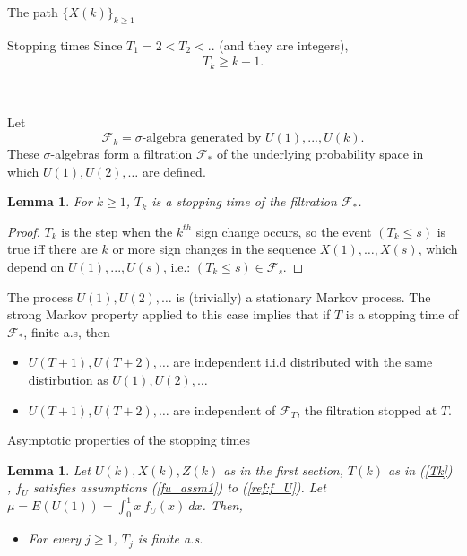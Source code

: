\documentclass[12pt]{article}
\newtheorem{lemma}[theorem]{Lemma}
\newenvironment{remark}[1][Remark]{\begin{trivlist}
		\item[\hskip \labelsep {\bfseries #1}]}{\end{trivlist}}
\begin{document}
\begin{section}{The path $\{X(k)\}_{k\ge1}$ }
\begin{subsection}{Stopping times}
Since $T_1 =2 < T_2 <..$ (and they are integers), 
\begin{align}
T_k \ge k+1 .
\end{align}

\   
\   
\   
\   

Let 
\begin{equation} \label{eq:filter}
\mathcal{F}_k = \sigma \text{-algebra generated by $U(1),...,U(k)$}.
\end{equation}
These $\sigma$-algebras form a filtration $\mathcal{F}_{\!*}$ of the underlying probability space in which $U(1), U(2), \dots$ are defined.

\begin{lemma}
For $k \ge 1$,  $T_k$ is a stopping time of the  filtration $\mathcal{F}_{\!*}$.
\end{lemma}

\begin{proof}
	$T_k$ is the step when the $k^{th}$ sign change occurs, so the event $(T_k \le s)$ is true iff there are $k$ or more sign changes in the sequence $X(1),\dots,X(s)$, which depend on  $U(1),...,U(s)$, i.e.: $(T_k \le s) \in \mathcal{F}_s$.
\end{proof}

	\begin{remark}[Remarks]
	The process $U(1), U(2), \dots$ is (trivially) a stationary Markov process. The strong Markov property applied to this case implies that if $T$ is a stopping time of $\mathcal{F}_{\!*}$, finite a.s, then
	
		\begin{itemize}
			\item[i.] $U(T+1), U(T+2) ,\dots$ are independent i.i.d distributed with the same distirbution as $U(1), U(2) ,\dots$
			\item[ii.] $U(T+1), U(T+2) ,\dots$ are independent of $\mathcal{F}_T$, the filtration stopped at $T$.
		\end{itemize}
	 
	\end{remark}
\end{subsection}


\begin{subsection}{Asymptotic properties of the stopping times}

\begin{lemma} \label{lmm:Ts} Let $U(k),X(k),Z(k)$ as in the first section, $T(k)$ as in (\ref{Tk}) , $f_U$ satisfies assumptions (\ref{fu_assm1}) to (\ref{ref:f_U}). Let $\mu = E(U(1)) = \int_{0}^{1} x \ f_U(x) \ dx$. Then,
\begin{itemize}
	\item[i.] For every $j \ge 1$, $T_{j}$ is finite a.s.
	

\end{itemize}
\end{lemma}
\end{subsection}
\end{section}
\end{document}
